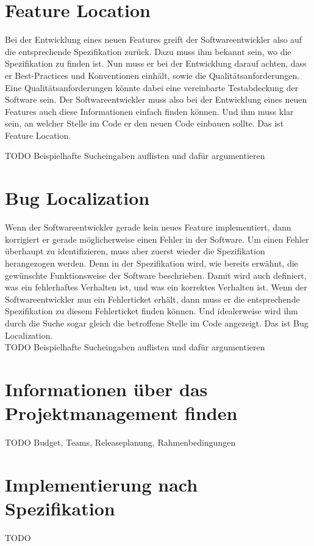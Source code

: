 \section{Feature Location}
Bei der Entwicklung eines neuen Features greift der Softwareentwickler also auf die entsprechende Spezifikation zurück.
Dazu muss ihm bekannt sein, wo die Spezifikation zu finden ist.
Nun muss er bei der Entwicklung darauf achten, dass er Best-Practices und Konventionen einhält, sowie die Qualitätsanforderungen.
Eine Qualitätsanforderungen könnte dabei eine vereinbarte Testabdeckung der Software sein.
Der Softwareentwickler muss also bei der Entwicklung eines neuen Features auch diese Informationen einfach finden können.
Und ihm muss klar sein, an welcher Stelle im Code er den neuen Code einbauen sollte.
Das ist Feature Location.

TODO Beispielhafte Sucheingaben auflisten und dafür argumentieren

\section{Bug Localization}
Wenn der Softwareentwickler gerade kein neues Feature implementiert, dann korrigiert er gerade möglicherweise einen Fehler in der Software.
Um einen Fehler überhaupt zu identifizieren, muss aber zuerst wieder die Spezifikation herangezogen werden.
Denn in der Spezifikation wird, wie bereits erwähnt, die gewünschte Funktionsweise der Software beschrieben.
Damit wird auch definiert, was ein fehlerhaftes Verhalten ist, und was ein korrektes Verhalten ist.
Wenn der Softwareentwickler nun ein Fehlerticket erhält, dann muss er die entsprechende Spezifikation zu diesem Fehlerticket finden können.
Und idealerweise wird ihm durch die Suche sogar gleich die betroffene Stelle im Code angezeigt.
Das ist Bug Localization.\\

TODO Beispielhafte Sucheingaben auflisten und dafür argumentieren

\section{Informationen über das Projektmanagement finden}
TODO Budget, Teams, Releaseplanung, Rahmenbedingungen

\section{Implementierung nach Spezifikation}
TODO


